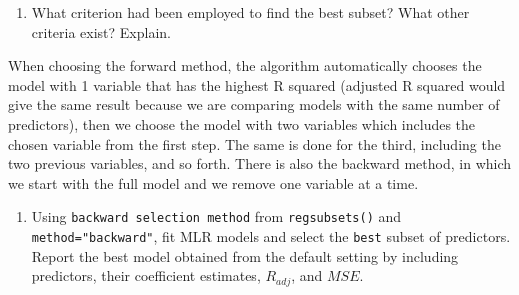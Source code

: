 \documentclass[
]{article}
\providecommand{\tightlist}{%
  \setlength{\itemsep}{0pt}\setlength{\parskip}{0pt}}
\begin{document}
\begin{enumerate}
\def\labelenumi{\alph{enumi}.}
\setcounter{enumi}{2}
\tightlist
\item
  What criterion had been employed to find the best subset? What other
  criteria exist? Explain.
\end{enumerate}

When choosing the forward method, the algorithm automatically chooses
the model with 1 variable that has the highest R squared (adjusted R
squared would give the same result because we are comparing models with
the same number of predictors), then we choose the model with two
variables which includes the chosen variable from the first step. The
same is done for the third, including the two previous variables, and so
forth. There is also the backward method, in which we start with the
full model and we remove one variable at a time.

\begin{enumerate}
\def\labelenumi{\alph{enumi}.}
\setcounter{enumi}{3}
\tightlist
\item
  Using \texttt{backward\ selection\ method} from \texttt{regsubsets()}
  and \texttt{method="backward"}, fit MLR models and select the
  \texttt{best} subset of predictors. Report the best model obtained
  from the default setting by including predictors, their coefficient
  estimates, \(R_{adj}\), and \(MSE\).
\end{enumerate}
\end{document}
